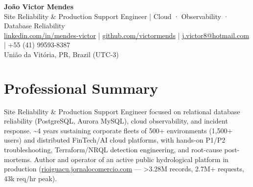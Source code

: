 \documentclass[10pt,a4paper]{article}
\begin{document}
\begin{center}
    {\huge \textbf{João Victor Mendes}} \\
    \vspace{2pt}
    {\large Site Reliability \& Production Support Engineer | Cloud · Observability · Database Reliability} \\
    \vspace{1.5pt}
    \href{https://linkedin.com/in/mendes-victor}{linkedin.com/in/mendes-victor} | \href{https://github.com/victormends}{github.com/victormends} | \href{mailto:j.victor8@hotmail.com}{j.victor8@hotmail.com} | +55 (41) 99593-8387 \\
    União da Vitória, PR, Brazil (\mbox{UTC-3})
\end{center}

\section{Professional Summary}
Site Reliability \& Production Support Engineer focused on relational database reliability (PostgreSQL, Aurora MySQL), cloud observability, and incident response. \textasciitilde{}4 years sustaining corporate fleets of 500+ environments (1,500+ users) and distributed FinTech/AI cloud platforms, with \mbox{hands-on} \mbox{P1/P2} troubleshooting, Terraform/NRQL detection engineering, and \mbox{root-cause} \mbox{post-mortems}. Author and operator of an active public hydrological platform in production (\href{https://rioiguacu.jornalocomercio.com}{rioiguacu.jornalocomercio.com} --- >3.28M records, 2.7M+ requests, 43k req/hr peak).

\end{document}
